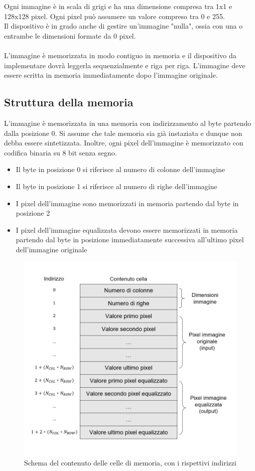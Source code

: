 \documentclass[a4paper, 12pt]{article}
\begin{document}
\bigskip
Ogni immagine è in scala di grigi e ha una dimensione compresa tra 1x1 e 128x128 pixel. Ogni pixel può assumere un valore compreso tra 0 e 255. \\
Il dispositivo è in grado anche di gestire un'immagine "nulla", ossia con una o entrambe le dimensioni formate da 0 pixel.
\\\\
L'immagine è memorizzata in modo contiguo in memoria e il dispositivo da implementare dovrà leggerla sequenzialmente e riga per riga. L'immagine deve essere scritta in memoria immediatamente dopo l'immagine originale.

\subsection{Struttura della memoria}
L'immagine è memorizzata in una memoria con indirizzamento al byte partendo dalla posizione 0.
Si assume che tale memoria sia già instaziata e dunque non debba essere sintetizzata.
Inoltre, ogni pixel dell'immagine è memorizzato con codifica binaria su 8 bit senza segno.
\begin{itemize}
    \item Il byte in posizione 0 si riferisce al numero di colonne dell'immagine
    \item Il byte in posizione 1 si riferisce al numero di righe dell'immagine
    \item I pixel dell'immagine sono memorizzati in memoria partendo dal byte in posizione 2
    \item I pixel dell'immagine equalizzata devono essere memorizzati in memoria partendo dal byte in posizione immediatamente successiva all'ultimo pixel dell'immagine originale
\end{itemize}

\begin{figure}[h]
    \centering
    \includegraphics[scale=0.90]{introduzione/memory_scheme.png}
    \caption{Schema del contenuto delle celle di memoria, con i rispettivi indirizzi}
    \label{fig:memory_scheme}
\end{figure}
\end{document}
